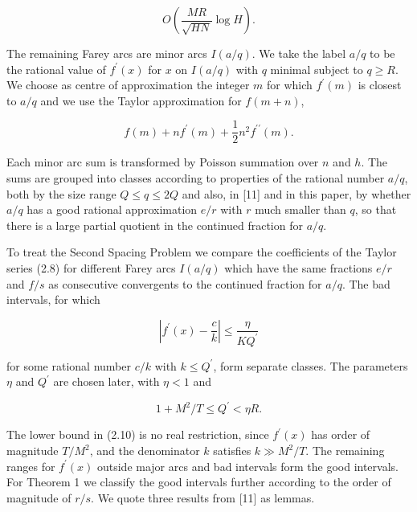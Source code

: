 \documentclass[10pt]{article}
\begin{document}
\begin{equation*}
O\left(\frac{M R}{\sqrt{H N}} \log H\right). \tag{2.7}
\end{equation*}


The remaining Farey arcs are minor arcs $I(a / q)$. We take the label $a / q$ to be the rational value of $f^{\prime}(x)$ for $x$ on $I(a / q)$ with $q$ minimal subject to $q \geqslant R$. We choose as centre of approximation the integer $m$ for which $f^{\prime}(m)$ is closest to $a / q$ and we use the Taylor approximation for $f(m+n)$,


\begin{equation*}
f(m)+n f^{\prime}(m)+\frac{1}{2} n^{2} f^{\prime \prime}(m). \tag{2.8}
\end{equation*}


Each minor arc sum is transformed by Poisson summation over $n$ and $h$. The sums are grouped into classes according to properties of the rational number $a / q$, both by the size range $Q \leqslant q \leqslant 2 Q$ and also, in [11] and in this paper, by whether $a / q$ has a good rational approximation $e / r$ with $r$ much smaller than $q$, so that there is a large partial quotient in the continued fraction for $a / q$.

To treat the Second Spacing Problem we compare the coefficients of the Taylor series (2.8) for different Farey arcs $I(a / q)$ which have the same fractions $e / r$ and $f / s$ as consecutive convergents to the continued fraction for $a / q$. The bad intervals, for which


\begin{equation*}
\left|f^{\prime}(x)-\frac{c}{k}\right| \leqslant \frac{\eta}{K Q^{\prime}} \tag{2.9}
\end{equation*}


for some rational number $c / k$ with $k \leqslant Q^{\prime}$, form separate classes. The parameters $\eta$ and $Q^{\prime}$ are chosen later, with $\eta<1$ and


\begin{equation*}
1+M^{2} / T \leqslant Q^{\prime}<\eta R. \tag{2.10}
\end{equation*}


The lower bound in (2.10) is no real restriction, since $f^{\prime}(x)$ has order of magnitude $T / M^{2}$, and the denominator $k$ satisfies $k \gg M^{2} / T$. The remaining ranges for $f^{\prime}(x)$ outside major arcs and bad intervals form the good intervals. For Theorem 1 we classify the good intervals further according to the order of magnitude of $r / s$. We quote three results from [11] as lemmas.
\end{document}
